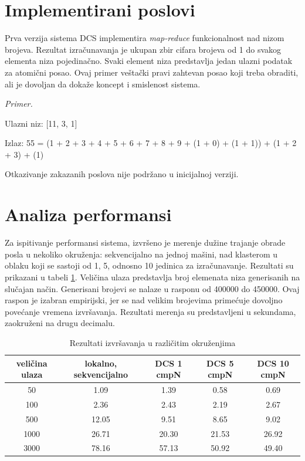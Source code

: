 \documentclass[12pt,oneside]{memoir}
\begin{document}
\section{Implementirani poslovi}

Prva verzija sistema DCS implementira \emph{map-reduce} funkcionalnost nad nizom brojeva. Rezultat izračunavanja je ukupan zbir cifara brojeva od 1 do svakog elementa niza pojedinačno. Svaki element niza predstavlja jedan ulazni podatak za atomični posao. Ovaj primer veštački pravi zahtevan posao koji treba obraditi, ali je dovoljan da dokaže koncept i smislenost sistema.

\emph{Primer.}

Ulazni niz: [11, 3, 1]

Izlaz: 55 = (1 + 2 + 3 + 4 + 5 + 6 + 7 + 8 + 9 + (1 + 0) + (1 + 1)) + (1 + 2 + 3) + (1)

Otkazivanje zakazanih poslova nije podržano u inicijalnoj verziji.

\section{Analiza performansi}

Za ispitivanje performansi sistema, izvršeno je merenje dužine trajanje obrade posla u nekoliko okruženja: sekvencijalno na jednoj mašini, nad klasterom u oblaku koji se sastoji od 1, 5, odnosno 10 jedinica za izračunavanje. Rezultati su prikazani u tabeli \ref{tbl:rezultati}. Veličina ulaza predstavlja broj elemenata niza generisanih na slučajan način. Generisani brojevi se nalaze u rasponu od 400000 do 450000. Ovaj raspon je izabran empirijski, jer se nad velikim brojevima primećuje dovoljno povećanje vremena izvršavanja. Rezultati merenja su predstavljeni u sekundama, zaokruženi na drugu decimalu.

\begin{table}
\centering
\begin{center}
\begin{tabular}{ |c||c|c|c|c| } 
 \hline
  veličina ulaza & lokalno, sekvencijalno & DCS 1 cmpN & DCS 5 cmpN & DCS 10 cmpN \\ 
 \hline
 50 & 1.09 & 1.39 & 0.58 & 0.69 \\ 
 100 & 2.36 & 2.43 & 2.19 & 2.67 \\ 
 500 & 12.05 & 9.51 & 8.65 & 9.02 \\ 
 1000 & 26.71 & 20.30 & 21.53 & 26.92 \\ 
 3000 & 78.16 & 57.13 & 50.92 & 49.40 \\ 
 \hline
\end{tabular}
\caption{Rezultati izvršavanja u različitim okruženjima}
\label{tbl:rezultati}
\end{center}
\end{table}
\end{document}
